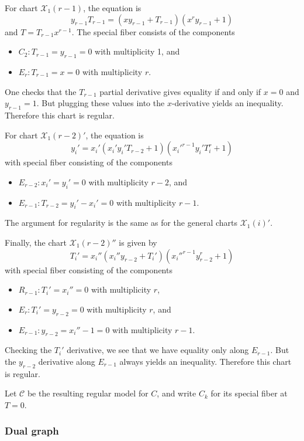 \documentclass[reqno]{amsart}
\theoremstyle{definition}
\theoremstyle{remark}
\def\XX{\mathcal{X}}
\def\scd{\mathscr{C}}
\begin{document}
  For chart $\XX_1(r-1)$, the equation is
  \[
  y_{r-1} T_{r-1} = (x y_{r-1} + T_{r-1}) (x^{r} y_{r-1} + 1)
  \]
  and $T = T_{r-1} x^{r-1}$. The special fiber consists of the components
  \begin{itemize}
      \item $C_2: T_{r-1} = y_{r-1} = 0$ with multiplicity 1, and
      \item $E_r: T_{r-1} = x = 0$ with multiplicity $r$.
  \end{itemize}
  One checks that the $T_{r-1}$ partial derivative gives equality if and only if $x = 0$ and $y_{r-1} = 1$. But plugging these values into the $x$-derivative yields an inequality. Therefore this chart is regular.

  For chart $\XX_1(r-2)'$, the equation is
  \[
  y_i' = x_i' (x_i' y_i' T_{r-2} + 1) (x_i'^{r-1} y_i' T_i^{r} + 1)
  \]
  with special fiber consisting of the components
  \begin{itemize}
      \item $E_{r-2}: x_i' = y_i' = 0$ with multiplicity $r-2$, and
      \item $E_{r-1}: T_{r-2} = y_i' - x_i' = 0$ with multiplicity $r-1$.
  \end{itemize}
  The argument for regularity is the same as for the general charts $\XX_1(i)'$.

  Finally, the chart $\XX_1(r-2)''$ is given by
  \[
  T_i' = x_i'' (x_i'' y_{r-2} + T_i') (x_i''^{r-1} y_{r-2}^{r} + 1)
  \]
  with special fiber consisting of the components
  \begin{itemize}
      \item $R_{r-1}: T_i' = x_i'' = 0$ with multiplicity $r$,
      \item $E_r: T_i' = y_{r-2} = 0$ with multiplicity $r$, and
      \item $E_{r-1}: y_{r-2} = x_i'' - 1 = 0$ with multiplicity $r-1$.
  \end{itemize}
  Checking the $T_i'$ derivative, we see that we have equality only along $E_{r-1}$. But the $y_{r-2}$ derivative along $E_{r-1}$ always yields an inequality. Therefore this chart is regular.

  Let $\scd$ be the resulting regular model for $C$, and write $C_k$ for its special fiber at $T = 0$.

\subsubsection{Dual graph}
\label{sec:dual-graph}
\end{document}
